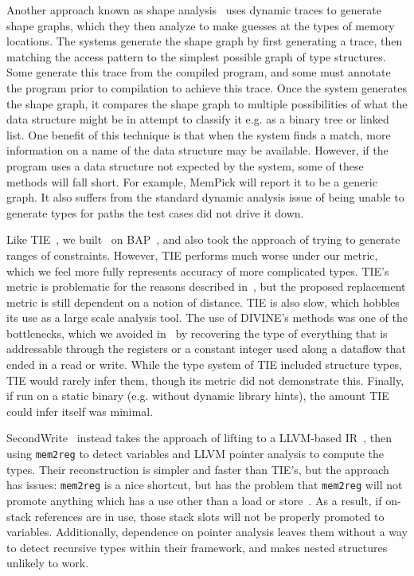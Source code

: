 Another approach known as shape analysis~\cite{August, Haller2013a,White2013,Jung2009,Cozzie} uses dynamic traces to generate shape graphs, which they then analyze to make guesses at the types of memory locations. The systems generate the shape graph by first generating a trace, then matching the access pattern to the simplest possible graph of type structures. Some generate this trace from the compiled program, and some must annotate the program prior to compilation to achieve this trace. Once the system generates the shape graph, it compares the shape graph to multiple possibilities of what the data structure might be in attempt to classify it e.g. as a binary tree or linked list. One benefit of this technique is that when the system finds a match, more information on a name of the data structure may be available. However, if the program uses a data structure not expected by the system, some of these methods will fall short. For example, MemPick will report it to be a generic graph. It also suffers from the standard dynamic analysis issue of being unable to generate types for paths the test cases did not drive it down.

Like TIE~\cite{tie}, we built \bitr\ on BAP~\cite{bap}, and also took the approach of trying to generate ranges of constraints. However, TIE performs much worse under our metric, which we feel more fully represents accuracy of more complicated types. TIE's metric is problematic for the reasons described in~\cite{sw}, but the proposed replacement metric is still dependent on a notion of distance. TIE is also slow, which hobbles its use as a large scale analysis tool. The use of DIVINE's methods was one of the bottlenecks, which we avoided in \bitr\ by recovering the type of everything that is addressable through the registers or a constant integer used along a dataflow that ended in a read or write. While the type system of TIE included structure types, TIE would rarely infer them, though its metric did not demonstrate this. Finally, if run on a static binary (e.g. without dynamic library hints), the amount TIE could infer itself was minimal.

SecondWrite~\cite{sw} instead takes the approach of lifting to a LLVM-based IR~\cite{llvm}, then using \texttt{mem2reg} to detect variables and LLVM pointer analysis to compute the types. Their reconstruction is simpler and faster than TIE's, but the approach has issues: \texttt{mem2reg} is a nice shortcut, but has the problem that \texttt{mem2reg} will not promote anything which has a use other than a load or store~\cite{llvm}. As a result, if on-stack references are in use, those stack slots will not be properly promoted to variables. Additionally, dependence on pointer analysis leaves them without a way to detect recursive types within their framework, and makes nested structures unlikely to work.

